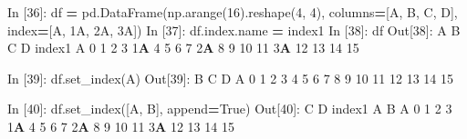 \documentclass[
]{book}
\newenvironment{Shaded}{\begin{snugshade}}{\end{snugshade}}
\newcommand{\DecValTok}[1]{\textcolor[rgb]{0.00,0.00,0.81}{#1}}
\newcommand{\ErrorTok}[1]{\textcolor[rgb]{0.64,0.00,0.00}{\textbf{#1}}}
\newcommand{\NormalTok}[1]{#1}
\newcommand{\OperatorTok}[1]{\textcolor[rgb]{0.81,0.36,0.00}{\textbf{#1}}}
\newcommand{\StringTok}[1]{\textcolor[rgb]{0.31,0.60,0.02}{#1}}
\newcommand{\VariableTok}[1]{\textcolor[rgb]{0.00,0.00,0.00}{#1}}
\begin{document}
\begin{Shaded}
\begin{Highlighting}[]
\NormalTok{In [}\DecValTok{36}\NormalTok{]: df }\OperatorTok{=}\NormalTok{ pd.DataFrame(np.arange(}\DecValTok{16}\NormalTok{).reshape(}\DecValTok{4}\NormalTok{, }\DecValTok{4}\NormalTok{),}
\NormalTok{                  columns}\OperatorTok{=}\NormalTok{[}\StringTok{\textquotesingle{}A\textquotesingle{}}\NormalTok{, }\StringTok{\textquotesingle{}B\textquotesingle{}}\NormalTok{, }\StringTok{\textquotesingle{}C\textquotesingle{}}\NormalTok{, }\StringTok{\textquotesingle{}D\textquotesingle{}}\NormalTok{],}
\NormalTok{                  index}\OperatorTok{=}\NormalTok{[}\StringTok{\textquotesingle{}A\textquotesingle{}}\NormalTok{, }\StringTok{\textquotesingle{}1A\textquotesingle{}}\NormalTok{, }\StringTok{\textquotesingle{}2A\textquotesingle{}}\NormalTok{, }\StringTok{\textquotesingle{}3A\textquotesingle{}}\NormalTok{])}
\NormalTok{In [}\DecValTok{37}\NormalTok{]: df.index.name }\OperatorTok{=} \StringTok{\textquotesingle{}index1\textquotesingle{}}
\NormalTok{In [}\DecValTok{38}\NormalTok{]: df}
\NormalTok{Out[}\DecValTok{38}\NormalTok{]:}
\NormalTok{         A   B   C   D}
\NormalTok{index1                }
\NormalTok{A        }\DecValTok{0}   \DecValTok{1}   \DecValTok{2}   \DecValTok{3}
\DecValTok{1}\ErrorTok{A}       \DecValTok{4}   \DecValTok{5}   \DecValTok{6}   \DecValTok{7}
\DecValTok{2}\ErrorTok{A}       \DecValTok{8}   \DecValTok{9}  \DecValTok{10}  \DecValTok{11}
\DecValTok{3}\ErrorTok{A}      \DecValTok{12}  \DecValTok{13}  \DecValTok{14}  \DecValTok{15}

\NormalTok{In [}\DecValTok{39}\NormalTok{]: df.set\_index(}\StringTok{\textquotesingle{}A\textquotesingle{}}\NormalTok{)}
\NormalTok{Out[}\DecValTok{39}\NormalTok{]:}
\NormalTok{     B   C   D}
\NormalTok{A             }
\DecValTok{0}    \DecValTok{1}   \DecValTok{2}   \DecValTok{3}
\DecValTok{4}    \DecValTok{5}   \DecValTok{6}   \DecValTok{7}
\DecValTok{8}    \DecValTok{9}  \DecValTok{10}  \DecValTok{11}
\DecValTok{12}  \DecValTok{13}  \DecValTok{14}  \DecValTok{15}

\NormalTok{In [}\DecValTok{40}\NormalTok{]: df.set\_index([}\StringTok{\textquotesingle{}A\textquotesingle{}}\NormalTok{, }\StringTok{\textquotesingle{}B\textquotesingle{}}\NormalTok{], append}\OperatorTok{=}\VariableTok{True}\NormalTok{)}
\NormalTok{Out[}\DecValTok{40}\NormalTok{]: }
\NormalTok{               C   D}
\NormalTok{index1 A  B         }
\NormalTok{A      }\DecValTok{0}  \DecValTok{1}    \DecValTok{2}   \DecValTok{3}
\DecValTok{1}\ErrorTok{A}     \DecValTok{4}  \DecValTok{5}    \DecValTok{6}   \DecValTok{7}
\DecValTok{2}\ErrorTok{A}     \DecValTok{8}  \DecValTok{9}   \DecValTok{10}  \DecValTok{11}
\DecValTok{3}\ErrorTok{A}     \DecValTok{12} \DecValTok{13}  \DecValTok{14}  \DecValTok{15}


\end{Highlighting}
\end{Shaded}
\end{document}
